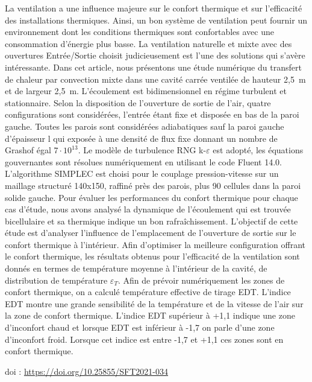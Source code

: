 {\normalsize
La ventilation a une influence majeure sur le confort thermique et sur l'efficacité des installations thermiques. Ainsi, un bon système de ventilation peut fournir un environnement dont les conditions thermiques sont confortables avec une consommation d'énergie plus basse. La ventilation naturelle et mixte avec des ouvertures Entrée/Sortie choisit judicieusement est l'une des solutions qui s'avère intéressante. Dans cet article, nous présentons une étude numérique du transfert de chaleur par convection mixte dans une cavité carrée ventilée de hauteur 2,5~m et de largeur 2,5~m. L'écoulement est bidimensionnel en régime turbulent et stationnaire. Selon la disposition de l'ouverture de sortie de l'air, quatre configurations sont considérées, l'entrée étant fixe et disposée en bas de la paroi gauche. Toutes les parois sont considérées adiabatiques sauf la paroi gauche d'épaisseur l qui exposée à une densité de flux fixe donnant un nombre de Grashof égal $\unit{7\cdot 10^{13}}$. Le modèle de turbulence RNG k-$\varepsilon$ est adopté, les équations gouvernantes sont résolues numériquement en utilisant le code Fluent 14.0. L'algorithme SIMPLEC est choisi pour le couplage pression-vitesse sur un maillage structuré 140x150, raffiné près des parois, plus 90 cellules dans la paroi solide gauche. Pour évaluer les performances du confort thermique pour chaque cas d'étude, nous avons analysé la dynamique de l'écoulement qui est trouvée bicellulaire et sa thermique indique un bon rafraîchissement. L'objectif de cette étude est d'analyser l'influence de l'emplacement de l'ouverture de sortie sur le confort thermique à l'intérieur. Afin d'optimiser la meilleure configuration offrant le confort thermique, les résultats obtenus pour l'efficacité de la ventilation sont donnés en termes de température moyenne à l'intérieur de la cavité, de distribution de température $\varepsilon_T$. Afin de prévoir numériquement les zones de confort thermique, on a calculé température effective de tirage EDT. L'indice EDT montre une grande sensibilité de la température et de la vitesse de l'air sur la zone de confort thermique. L'indice EDT supérieur à +1,1 indique une zone d'inconfort chaud et lorsque EDT est inférieur à -1,7 on parle d'une zone d'inconfort froid. Lorsque cet indice est entre -1,7 et +1,1 ces zones sont en confort thermique.

 \vfill doi : \url{https://doi.org/10.25855/SFT2021-034}

}
 
